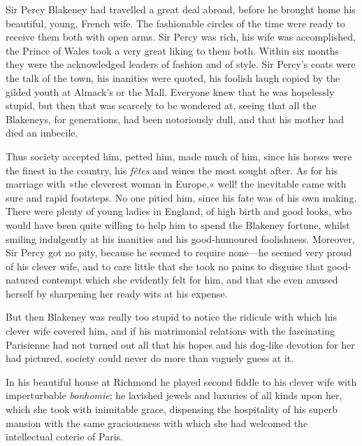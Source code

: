Sir Percy Blakeney had travelled a great deal abroad, before he brought home his beautiful, young, French wife. The fashionable circles of the time were ready to receive them both with open arms. Sir Percy was rich, his wife was accomplished, the Prince of Wales took a very great liking to them both. Within six months they were the acknowledged leaders of fashion and of style. Sir Percy's coats were the talk of the town, his inanities were quoted, his foolish laugh copied by the gilded youth at Almack's or the Mall. Everyone knew that he was hopelessly stupid, but then that was scarcely to be wondered at, seeing that all the Blakeneys, for generations, had been notoriously dull, and that his mother had died an imbecile.

Thus society accepted him, petted him, made much of him, since his horses were the finest in the country, his \textit{fêtes} and wines the most sought after. As for his marriage with »the cleverest woman in Europe,« well! the inevitable came with sure and rapid footsteps. No one pitied him, since his fate was of his own making. There were plenty of young ladies in England, of high birth and good looks, who would have been quite willing to help him to spend the Blakeney fortune, whilst smiling indulgently at his inanities and his good-humoured foolishness. Moreover, Sir Percy got no pity, because he seemed to require none\allowbreak---\allowbreak he seemed very proud of his clever wife, and to care little that she took no pains to disguise that good-natured contempt which she evidently felt for him, and that she even amused herself by sharpening her ready wits at his expense.

But then Blakeney was really too stupid to notice the ridicule with which his clever wife covered him, and if his matrimonial relations with the fascinating Parisienne had not turned out all that his hopes and his dog-like devotion for her had pictured, society could never do more than vaguely guess at it.

In his beautiful house at Richmond he played second fiddle to his clever wife with imperturbable \textit{bonhomie}; he lavished jewels and luxuries of all kinds upon her, which she took with inimitable grace, dispensing the hospitality of his superb mansion with the same graciousness with which she had welcomed the intellectual coterie of Paris.


